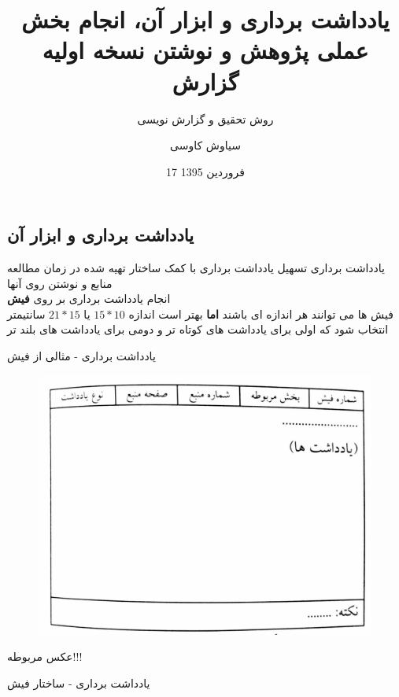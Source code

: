 \documentclass[14pt]{beamer}
\title{یادداشت برداری و ابزار آن، انجام بخش عملی پژوهش و نوشتن نسخه اولیه گزارش}
\subtitle{\color{brown} روش تحقیق و گزارش نویسی}
\date{17 فروردین 1395}
\author{سیاوش کاوسی}
\institute{دانشگاه صنعتی امیرکبیر}
\newcommand{\sectionfontsize}{\fontsize{22pt}{0pt}\selectfont}
\newcommand{\framefontsizelarge}{\fontsize{18pt}{0pt}\selectfont}
\newcommand{\frametitlefontsize}{\fontsize{20pt}{0pt}\selectfont}
\newcommand{\defaultvspace}{\vspace{5mm}}
\begin{document}
\begin{persian}
	\maketitle
	\everypar{\rightskip\rightmargin}		
	
	\section{\sectionfontsize یادداشت برداری و ابزار آن}	
	
	\begin{frame}{\frametitlefontsize یادداشت برداری}
		\framefontsizelarge
		تسهیل یادداشت برداری با کمک ساختار تهیه شده در زمان مطالعه منابع و نوشتن روی آنها \defaultvspace\\
		انجام یادداشت برداری بر روی \textbf{فیش}\defaultvspace\\
		فیش ها می توانند هر اندازه ای باشند  \textbf{اما} بهتر است اندازه  $15*10$ یا  $21*15$ سانتیمتر انتخاب شود که اولی برای یادداشت های کوتاه تر و دومی برای یادداشت های بلند تر
	\end{frame}	
	
	\begin{frame}{\frametitlefontsize یادداشت برداری - مثالی از فیش}
		\framefontsizelarge
		\begin{figure}
			\includegraphics[width=\linewidth]{pic.jpg}
		\end{figure}
		عکس مربوطه!!!
	\end{frame}	
	
	\begin{frame}{\frametitlefontsize یادداشت برداری - ساختار فیش}
		\framefontsizelarge
		

\end{frame}
\end{persian}
\end{document}
